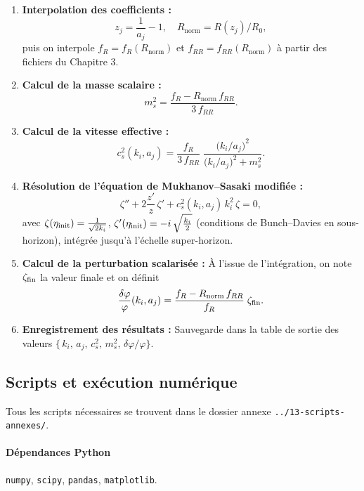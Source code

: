 \begin{enumerate}
  \item \textbf{Interpolation des coefficients :}  
    \[
      z_{j} = \frac{1}{a_{j}} - 1,
      \quad
      R_{\mathrm{norm}} = R(z_{j})/R_{0},
    \]
    puis on interpole \(f_{R}=f_{R}(R_{\mathrm{norm}})\) et \(f_{RR}=f_{RR}(R_{\mathrm{norm}})\) à partir des fichiers du Chapitre 3.
    
  \item \textbf{Calcul de la masse scalaire :}  
    \[
      m_{s}^{2}
      = \frac{f_{R} - R_{\mathrm{norm}}\,f_{RR}}{3\,f_{RR}}.
    \]

  \item \textbf{Calcul de la vitesse effective :}  
    \[
      c_{s}^{2}(k_{i},a_{j})
      = \frac{f_{R}}{3\,f_{RR}}
        \;\frac{\bigl(k_{i}/a_{j}\bigr)^{2}}{\bigl(k_{i}/a_{j}\bigr)^{2} + m_{s}^{2}}.
    \]

  \item \textbf{Résolution de l’équation de Mukhanov–Sasaki modifiée :}  
    \[
      \zeta'' + 2\frac{z'}{z}\,\zeta' + c_{s}^{2}(k_{i},a_{j})\,k_{i}^{2}\,\zeta = 0,
    \]
    avec  
    \(\zeta(\eta_{\rm init}) = \frac{1}{\sqrt{2k_{i}}}\),  
    \(\zeta'(\eta_{\rm init}) = -i\,\sqrt{\tfrac{k_{i}}{2}}\)  
    (conditions de Bunch–Davies en sous-horizon),  
    intégrée jusqu’à l’échelle super-horizon.

  \item \textbf{Calcul de la perturbation scalarisée :}  
    À l’issue de l’intégration, on note \(\zeta_{\rm fin}\) la valeur finale et on définit  
    \[
      \frac{\delta\varphi}{\varphi}(k_{i},a_{j})
      = \frac{f_{R} - R_{\mathrm{norm}}\,f_{RR}}{f_{R}}\;\zeta_{\rm fin}.
    \]

  \item \textbf{Enregistrement des résultats :}  
    Sauvegarde dans la table de sortie des valeurs  
    \(\{\,k_{i},\,a_{j},\,c_{s}^{2},\,m_{s}^{2},\,\delta\varphi/\varphi\}\).
\end{enumerate}

\subsection{Scripts et exécution numérique}
Tous les scripts nécessaires se trouvent dans le dossier annexe \texttt{../13-scripts-annexes/}.  

\paragraph{Dépendances Python}  
\texttt{numpy}, \texttt{scipy}, \texttt{pandas}, \texttt{matplotlib}.

